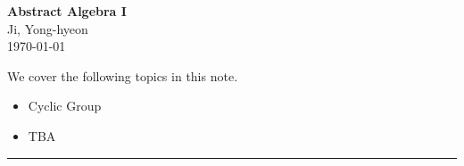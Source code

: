 \documentclass[11pt,openany]{article}
\begin{document}
\begin{center}
	\huge\textbf{Abstract Algebra I}\\
	\vspace{0.5em}
	\large{Ji, Yong-hyeon}\\
	\vspace{0.5em}
	\normalsize{\today}\\
\end{center}

\noindent 
We cover the following topics in this note.
\begin{itemize}
	\item Cyclic Group
	\item TBA
\end{itemize}
\hrule\vspace{12pt}
\newpage

\end{document}
